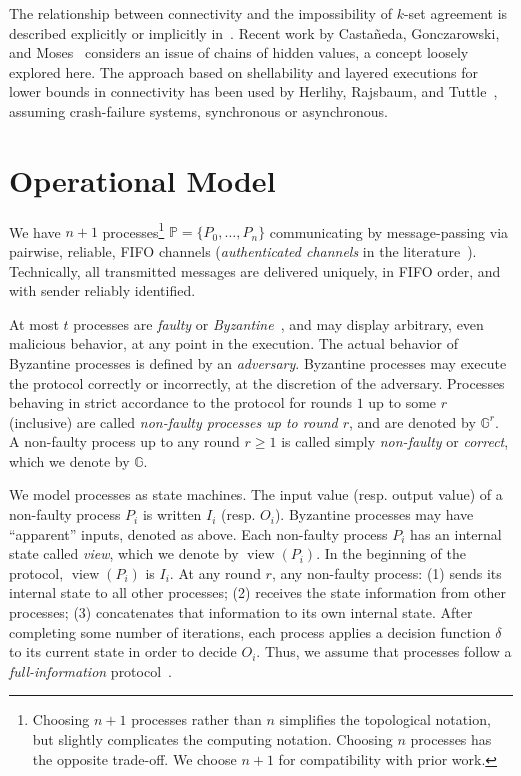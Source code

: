 \documentclass[11pt]{article}
\newcommand{\bbG}{\ensuremath{\mathbb{G}}}
\newcommand{\bbP}{\ensuremath{\mathbb{P}}}
\DeclareMathOperator{\view}{view}
\newcommand{\set}[1]{\{#1\}}
\begin{document}
The relationship between connectivity and the impossibility of $k$-set agreement
is described explicitly or implicitly in~\cite{ChaudhuriHLT2000,HerlihyShavit1999,SaksZ1993}.
Recent work by Castañeda, Gonczarowski, and Moses~\cite{CastaMosesBA2013}
considers an issue of chains of hidden values,
a concept loosely explored here.
The approach based on shellability and layered executions for lower bounds in connectivity
has been used by Herlihy, Rajsbaum, and Tuttle~\cite{HerlihyRT98,HerlihyRT09,ConcurrentShellable},
assuming crash-failure systems, synchronous or asynchronous.

\section{Operational Model}
\label{Sec-OperationalModel}

We have $n+1$ processes\footnote{
Choosing $n+1$ processes rather than $n$ simplifies the topological notation,
but slightly complicates the computing notation.
Choosing $n$ processes has the opposite trade-off.
We choose $n+1$ for compatibility with prior work.
}
$\bbP = \set{P_0, \ldots, P_n}$
communicating by message-passing via pairwise, reliable, FIFO channels
(\emph{authenticated channels} in the literature~\cite{RSPBook}).
Technically,
all transmitted messages are delivered uniquely, in FIFO order,
and with sender reliably identified.

At most $t$ processes are \emph{faulty} or \emph{Byzantine}~\cite{Lamport1982},
and may display arbitrary, even malicious behavior, at any point in the execution.
The actual behavior of Byzantine processes
is defined by an \emph{adversary}.
Byzantine processes may execute the protocol correctly or incorrectly,
at the discretion of the adversary.
Processes behaving in strict accordance to the protocol for rounds $1$ up to some $r$ (inclusive)
are called \emph{non-faulty processes up to round $r$},
and are denoted by $\bbG^r$.
A non-faulty process up to any round $r \ge 1$ is called simply \emph{non-faulty} or \emph{correct},
which we denote by $\bbG$.

We model processes as state machines.
The input value (resp. output value) of a non-faulty process $P_i$ is written $I_i$ (resp. $O_i$).
Byzantine processes may have ``apparent'' inputs,
denoted as above.
Each non-faulty process $P_i$ has an internal state called \emph{view}, which we denote by $\view(P_i)$.
In the beginning of the protocol, $\view(P_i)$ is $I_i$.
At any round $r$,
any non-faulty process:
(1) sends its internal state to all other processes;
(2) receives the state information from other processes;
(3) concatenates that information to its own internal state.
After completing some number of iterations,
each process applies a decision function $\delta$ to its current state in order to decide $O_i$.
Thus,
we assume that processes follow a \emph{full-information} protocol~\cite{HerlihyRT09}.
\end{document}
